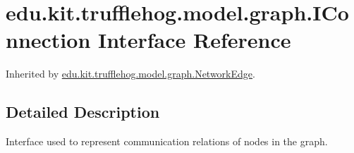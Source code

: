 \hypertarget{interfaceedu_1_1kit_1_1trufflehog_1_1model_1_1graph_1_1_i_connection}{}\section{edu.\+kit.\+trufflehog.\+model.\+graph.\+I\+Connection Interface Reference}
\label{interfaceedu_1_1kit_1_1trufflehog_1_1model_1_1graph_1_1_i_connection}


Inherited by \hyperlink{classedu_1_1kit_1_1trufflehog_1_1model_1_1graph_1_1_network_edge}{edu.\+kit.\+trufflehog.\+model.\+graph.\+Network\+Edge}.



\subsection{Detailed Description}
Interface used to represent communication relations of nodes in the graph. 